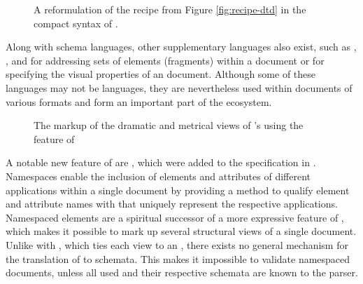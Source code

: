\documentclass[
  a5paper,10pt,           %
  dvipsnames              %
]{book}
\begin{document}
\begin{figure}
  \caption{A reformulation of the recipe  from Figure
    \ref{fig:recipe-dtd} in the compact syntax of .%
    }
  \label{fig:recipe-rnc}
\end{figure}

Along with schema languages, other supplementary languages also exist, such as
, , and  for addressing sets of elements
(fragments) within a  document or  for specifying the
visual properties of an  document. Although some of these
languages may not be  languages, they are nevertheless used within
documents of various  formats and form an important part of the
ecosystem.

\begin{figure}[b!]
  \caption{The markup of the dramatic and metrical views of 's  using the  feature of
    }
\end{figure}

A notable new feature of  are %
, which were added to the specification
\cite{bray99} in \citeyear{bray99}. Namespaces enable the inclusion of elements
and attributes of different  applications within a single
 document by providing a method to qualify element and attribute
names with  that uniquely represent the respective 
applications. Namespaced elements are a spiritual successor of a more
expressive  feature of
, which makes it possible
to mark up several structural views of a single document. Unlike with
, which ties each view to an  ,
there exists no general mechanism for the translation of  to
 schemata. This makes it impossible to validate namespaced
 documents, unless all used  and their respective
schemata are known to the parser.

\end{document}
